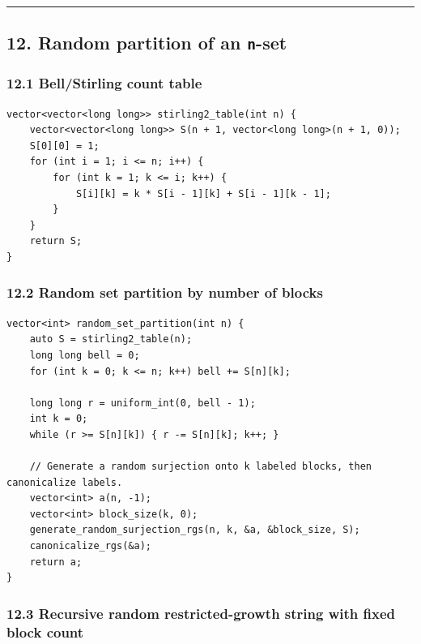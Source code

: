 \documentclass[11pt]{article}
\begin{document}
\begin{center}\rule{0.5\linewidth}{0.5pt}\end{center}

\subsection{\texorpdfstring{12. Random partition of an \texttt{n}-set}{12. Random partition of an n-set}}\label{random-partition-of-an-n-set}

\subsubsection{12.1 Bell/Stirling count table}\label{bellstirling-count-table}

\begin{verbatim}
vector<vector<long long>> stirling2_table(int n) {
    vector<vector<long long>> S(n + 1, vector<long long>(n + 1, 0));
    S[0][0] = 1;
    for (int i = 1; i <= n; i++) {
        for (int k = 1; k <= i; k++) {
            S[i][k] = k * S[i - 1][k] + S[i - 1][k - 1];
        }
    }
    return S;
}
\end{verbatim}

\subsubsection{12.2 Random set partition by number of blocks}\label{random-set-partition-by-number-of-blocks}

\begin{verbatim}
vector<int> random_set_partition(int n) {
    auto S = stirling2_table(n);
    long long bell = 0;
    for (int k = 0; k <= n; k++) bell += S[n][k];

    long long r = uniform_int(0, bell - 1);
    int k = 0;
    while (r >= S[n][k]) { r -= S[n][k]; k++; }

    // Generate a random surjection onto k labeled blocks, then canonicalize labels.
    vector<int> a(n, -1);
    vector<int> block_size(k, 0);
    generate_random_surjection_rgs(n, k, &a, &block_size, S);
    canonicalize_rgs(&a);
    return a;
}
\end{verbatim}

\subsubsection{12.3 Recursive random restricted-growth string with fixed block count}\label{recursive-random-restricted-growth-string-with-fixed-block-count}
\end{document}
